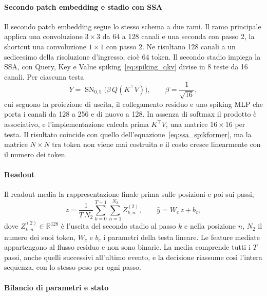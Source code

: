 \paragraph{Secondo patch embedding e stadio con SSA}
\label{subsec:stadio_ssa}
Il secondo patch embedding segue lo stesso schema a due rami. Il ramo principale applica una convoluzione $3\times3$ da 64 a 128 canali e una seconda con passo 2, la shortcut una convoluzione $1\times1$ con passo 2. Ne risultano 128 canali a un sedicesimo della risoluzione d'ingresso, cioè 64 token. Il secondo stadio impiega la SSA, con Query, Key e Value spiking~\eqref{eq:spiking_qkv} divise in 8 teste da 16 canali. Per ciascuna testa
\begin{equation}
\label{eq:ssa_baseline}
Y=\operatorname{SN}_{0{,}5}\bigl(\beta\,Q(K^{\top}V)\bigr),
\qquad
\beta=\frac{1}{\sqrt{16}},
\end{equation}
cui seguono la proiezione di uscita, il collegamento residuo e uno spiking MLP che porta i canali da 128 a 256 e di nuovo a 128. In assenza di softmax il prodotto è associativo, e l'implementazione calcola prima $K^{\top}V$, una matrice $16\times16$ per testa. Il risultato coincide con quello dell'equazione~\eqref{eq:ssa_spikformer}, ma la matrice $N\times N$ tra token non viene mai costruita e il costo cresce linearmente con il numero dei token.

\paragraph{Readout}
\label{subsec:readout_baseline}
Il readout media la rappresentazione finale prima sulle posizioni e poi sui passi,
\begin{equation}
\label{eq:readout_media}
z=\frac{1}{T\,N_2}\sum_{k=0}^{T-1}\sum_{n=1}^{N_2}Z^{(2)}_{k,n},
\qquad
\hat y=W_c\,z+b_c,
\end{equation}
dove $Z^{(2)}_{k,n}\in\mathbb R^{128}$ è l'uscita del secondo stadio al passo $k$ e nella posizione $n$, $N_2$ il numero dei suoi token, $W_c$ e $b_c$ i parametri della testa lineare. Le feature mediate appartengono al flusso residuo e non sono binarie. La media comprende tutti i $T$ passi, anche quelli successivi all'ultimo evento, e la decisione riassume così l'intera sequenza, con lo stesso peso per ogni passo.

\paragraph{Bilancio di parametri e stato}
\label{subsec:bilancio_baseline}

